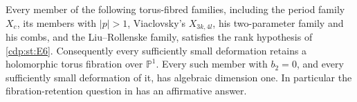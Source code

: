 \begin{proposition}\hypertarget{tag-01GW}{}\label{cdp:st:E7}

Every member of the following torus-fibred families,
including the period family $X_c$, its members with $|p|>1$,
Viaclovsky's $X_{3k,4l}$, his two-parameter family and his combs,
and the Liu--Rollenske family, satisfies the rank hypothesis of \ref{cdp:st:E6}.
Consequently every sufficiently small deformation retains a
holomorphic torus fibration over $\mathbb P^1$. Every such member
with $b_2=0$, and every sufficiently small deformation of it, has
algebraic dimension one. In particular the fibration-retention
question in \cite[Section~10(1)]{Viaclovsky2026Combs} has an
affirmative answer.
\end{proposition}


